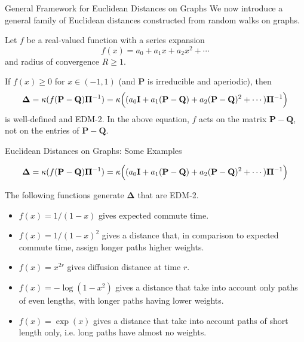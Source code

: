 \documentclass[professionalfonts,hyperref={pdfpagelabels=false,colorlinks=true,linkcolor=red}]{beamer}
\begin{document}
\begin{frame}{General Framework for Euclidean Distances on Graphs}
  We now introduce a general family of Euclidean distances constructed
  from random walks on graphs. 
  
  \vskip10pt Let $f$ be a real-valued function with a
    series expansion
    \begin{equation*}
      f(x) = a_0 + a_1 x + a_2 x^2 + \cdots
    \end{equation*}
    and radius of convergence $R \geq 1$. 
  
    \vskip10pt
    If $f(x) \geq 0$ for $x \in (-1,1)$ (and $\mathbf{P}$
    is irreducible and aperiodic), then
    \begin{equation*}
      \bm{\Delta} = \kappa(f(\mathbf{P} - \mathbf{Q}) \bm{\Pi}^{-1}) =
      \kappa\Bigl((a_0
      \mathbf{I} + a_1 (\mathbf{P} - \mathbf{Q}) + a_2 (\mathbf{P} -
      \mathbf{Q})^2 + \cdots)\bm{\Pi}^{-1}\Bigr)
    \end{equation*}
    is well-defined and EDM-2. In the above equation, $f$ acts on the
    matrix $\mathbf{P} - \mathbf{Q}$, not on the entries of $\mathbf{P} -
    \mathbf{Q}$. 
\end{frame}

\begin{frame}{Euclidean Distances on Graphs: Some Examples}
 
 \begin{equation*}
      \bm{\Delta} = \kappa(f(\mathbf{P} - \mathbf{Q}) \bm{\Pi}^{-1}) =
      \kappa\Bigl((a_0
      \mathbf{I} + a_1 (\mathbf{P} - \mathbf{Q}) + a_2 (\mathbf{P} -
      \mathbf{Q})^2 + \cdots)\bm{\Pi}^{-1}\Bigr)
    \end{equation*}

  \vskip 10pt The following functions generate $\bm{\Delta}$ that are
  EDM-2.
  \begin{itemize}
  \item $f(x) = 1/(1-x)$ gives expected commute time.
  \item $f(x) = 1/(1-x)^2$ gives a distance that, in comparison to
    expected commute time, assign longer paths higher weights.
  \item $f(x) = x^{2r}$ gives diffusion distance at time $r$.
  \item $f(x) = - \log{(1-x^2)}$ gives a distance that 
    take into account only paths of even lengths, with longer paths having
    lower weights.
  \item $f(x) = \exp(x)$ gives a distance that take into
    account paths of short length only, i.e. long paths have almost
    no weights.
  \end{itemize}
  \end{frame}
\end{document}
